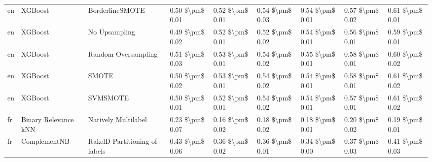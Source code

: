 \begin{tabular}{lllllllll}
      en &                         XGBoost &               BorderlineSMOTE &     0.50 \$\textbackslash pm\$ 0.01 &           0.52 \$\textbackslash pm\$ 0.01 &       0.54 \$\textbackslash pm\$ 0.03 &        0.54 \$\textbackslash pm\$ 0.01 &                         0.57 \$\textbackslash pm\$ 0.02 &     0.61 \$\textbackslash pm\$ 0.01 \\
      en &                         XGBoost &                 No Upsampling &     0.49 \$\textbackslash pm\$ 0.02 &           0.52 \$\textbackslash pm\$ 0.01 &       0.52 \$\textbackslash pm\$ 0.02 &        0.54 \$\textbackslash pm\$ 0.01 &                         0.56 \$\textbackslash pm\$ 0.01 &     0.59 \$\textbackslash pm\$ 0.01 \\
      en &                         XGBoost &           Random Oversampling &     0.51 \$\textbackslash pm\$ 0.03 &           0.53 \$\textbackslash pm\$ 0.01 &       0.54 \$\textbackslash pm\$ 0.02 &        0.55 \$\textbackslash pm\$ 0.01 &                         0.58 \$\textbackslash pm\$ 0.01 &     0.60 \$\textbackslash pm\$ 0.02 \\
      en &                         XGBoost &                         SMOTE &     0.50 \$\textbackslash pm\$ 0.02 &           0.53 \$\textbackslash pm\$ 0.01 &       0.54 \$\textbackslash pm\$ 0.02 &        0.54 \$\textbackslash pm\$ 0.01 &                         0.58 \$\textbackslash pm\$ 0.01 &     0.61 \$\textbackslash pm\$ 0.02 \\
      en &                         XGBoost &                      SVMSMOTE &     0.50 \$\textbackslash pm\$ 0.01 &           0.52 \$\textbackslash pm\$ 0.01 &       0.54 \$\textbackslash pm\$ 0.02 &        0.54 \$\textbackslash pm\$ 0.01 &                         0.57 \$\textbackslash pm\$ 0.01 &     0.61 \$\textbackslash pm\$ 0.02 \\
      fr &            Binary Relevance kNN &           Natively Multilabel &     0.23 \$\textbackslash pm\$ 0.07 &           0.16 \$\textbackslash pm\$ 0.02 &       0.18 \$\textbackslash pm\$ 0.02 &        0.18 \$\textbackslash pm\$ 0.01 &                         0.20 \$\textbackslash pm\$ 0.02 &     0.19 \$\textbackslash pm\$ 0.01 \\
      fr &                    ComplementNB & RakelD Partitioning of labels &     0.43 \$\textbackslash pm\$ 0.06 &           0.36 \$\textbackslash pm\$ 0.02 &       0.36 \$\textbackslash pm\$ 0.01 &        0.34 \$\textbackslash pm\$ 0.00 &                         0.37 \$\textbackslash pm\$ 0.03 &     0.41 \$\textbackslash pm\$ 0.03 \\

\end{tabular}
